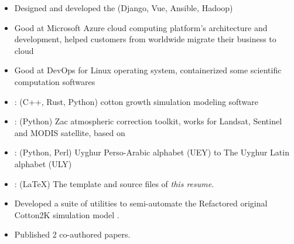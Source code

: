 \documentclass{resume}
\begin{document}
\begin{itemize}
  \item Designed and developed the  (Django, Vue, Ansible, Hadoop)
  \item Good at Microsoft Azure cloud computing platform's architecture and development, helped customers from worldwide migrate their business to cloud
  \item Good at DevOps for Linux operating system, containerized some scientific computation softwares
\end{itemize}

\begin{itemize}
  \item {}:
    (C++, Rust, Python)
    cotton growth simulation modeling software
  \item {}:
    (Python)
    Zac atmospheric correction toolkit, works for Landsat, Sentinel and MODIS satellite, based on 
  \item {}:
    (Python, Perl) Uyghur Perso-Arabic alphabet (UEY) to The Uyghur Latin alphabet (ULY)
  \item {}:
    (\LaTeX)
    The template and source files of \emph{this resume}.
\end{itemize}

\begin{itemize}
  \item Developed a suite of utilities to semi-automate the
    Refactored original Cotton2K simulation model
    .
  \item Published 2 co-authored papers.
\end{itemize}
\end{document}
